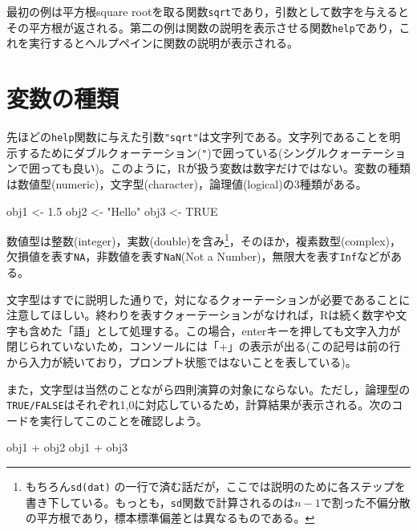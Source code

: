\documentclass[
  a4paper,
]{ltjsbook}
\newenvironment{Shaded}{\begin{snugshade}}{\end{snugshade}}
\newcommand{\ConstantTok}[1]{\textcolor[rgb]{0.56,0.35,0.01}{#1}}
\newcommand{\FloatTok}[1]{\textcolor[rgb]{0.68,0.00,0.00}{#1}}
\newcommand{\NormalTok}[1]{\textcolor[rgb]{0.00,0.23,0.31}{#1}}
\newcommand{\OtherTok}[1]{\textcolor[rgb]{0.00,0.23,0.31}{#1}}
\newcommand{\SpecialCharTok}[1]{\textcolor[rgb]{0.37,0.37,0.37}{#1}}
\newcommand{\StringTok}[1]{\textcolor[rgb]{0.13,0.47,0.30}{#1}}
\begin{document}
最初の例は平方根square
rootを取る関数\texttt{sqrt}であり，引数として数字を与えるとその平方根が返される。第二の例は関数の説明を表示させる関数\texttt{help}であり，これを実行するとヘルプペインに関数の説明が表示される。

\section{変数の種類}\label{ux5909ux6570ux306eux7a2eux985e}

先ほどの\texttt{help}関数に与えた引数\texttt{"sqrt"}は文字列である。文字列であることを明示するためにダブルクォーテーション(\texttt{"})で囲っている(シングルクォーテーションで囲っても良い)。このように，Rが扱う変数は数字だけではない。変数の種類は数値型(numeric)，文字型(character)，論理値(logical)の3種類がある。

\begin{Shaded}
\begin{Highlighting}[]
\NormalTok{obj1 }\OtherTok{\textless{}{-}} \FloatTok{1.5}
\NormalTok{obj2 }\OtherTok{\textless{}{-}} \StringTok{"Hello"}
\NormalTok{obj3 }\OtherTok{\textless{}{-}} \ConstantTok{TRUE}
\end{Highlighting}
\end{Shaded}

数値型は整数(integer)，実数(double)を含み\footnote{もちろん\texttt{sd(dat)}
  の一行で済む話だが，ここでは説明のために各ステップを書き下している。もっとも，\texttt{sd}関数で計算されるのは\(n-1\)で割った不偏分散の平方根であり，標本標準偏差とは異なるものである。}，そのほか，複素数型(complex)，欠損値を表す\texttt{NA}，非数値を表す\texttt{NaN}(Not
a Number)，無限大を表す\texttt{Inf}などがある。

文字型はすでに説明した通りで，対になるクォーテーションが必要であることに注意してほしい。終わりを表すクォーテーションがなければ，Rは続く数字や文字も含めた「語」として処理する。この場合，enterキーを押しても文字入力が閉じられていないため，コンソールには「+」の表示が出る(この記号は前の行から入力が続いており，プロンプト状態ではないことを表している)。

また，文字型は当然のことながら四則演算の対象にならない。ただし，論理型の\texttt{TRUE/FALSE}はそれぞれ1,0に対応しているため，計算結果が表示される。次のコードを実行してこのことを確認しよう。

\begin{Shaded}
\begin{Highlighting}[]
\NormalTok{obj1 }\SpecialCharTok{+}\NormalTok{ obj2}
\NormalTok{obj1 }\SpecialCharTok{+}\NormalTok{ obj3}
\end{Highlighting}
\end{Shaded}
\end{document}
